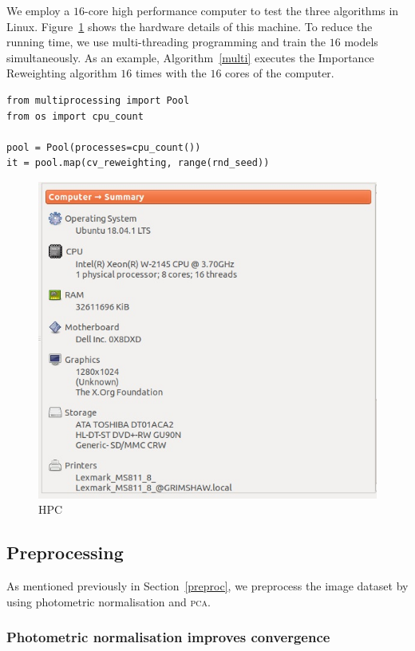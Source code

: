 \documentclass[12pt]{article} %
\begin{document}
We employ a $16$-core high performance computer to test the three algorithms in Linux. Figure~\ref{fig:HPC} shows the hardware details of this machine. To reduce the running time, we use multi-threading programming and train the $16$ models simultaneously. As an example, Algorithm~\ref{multi} executes the Importance Reweighting algorithm $16$ times with the $16$ cores of the computer. 
\begin{lstlisting}[caption=Multi-threading using the \texttt{multiprocessing} package of \texttt{Python}., label=multi]
from multiprocessing import Pool
from os import cpu_count

pool = Pool(processes=cpu_count())
it = pool.map(cv_reweighting, range(rnd_seed)) 
\end{lstlisting}
\begin{figure}
    \centering
	\includegraphics[scale=.7]{hpc}
	\caption{HPC}
	\label{fig:HPC}
\end{figure}
\subsection{Preprocessing}
As mentioned previously in Section~\ref{preproc}, we preprocess the image dataset by using photometric normalisation and \textsc{pca}. 

\subsubsection{Photometric normalisation improves convergence}
\end{document}
